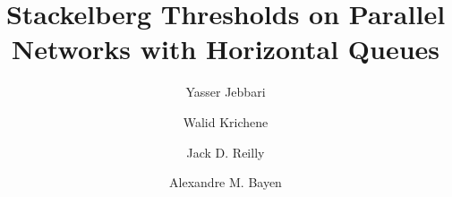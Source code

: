 \documentclass[letterpaper, 10 pt, conference]{ieeeconf}
\begin{document}
\author{Yasser Jebbari \and Walid Krichene \and Jack D. Reilly \and Alexandre M. Bayen}%
\title{Stackelberg Thresholds on Parallel Networks with Horizontal Queues}

\maketitle

\thispagestyle{empty}
\pagestyle{empty}


















\end{document}
